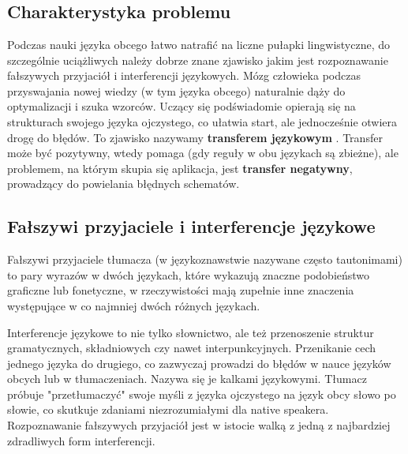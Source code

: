 \documentclass[polish]{aghengthesis}
\author{Jan Kowalski, Jan Malinowski, Wojciech Kowalski}
\date{\the\year}
\begin{document}
\maketitle
\tableofcontents

\chapter{\ChapterTitleProjectVision}
\section{Charakterystyka problemu}

Podczas nauki języka obcego łatwo natrafić na liczne pułapki lingwistyczne, do
szczególnie uciążliwych należy dobrze znane zjawisko jakim jest rozpoznawanie
fałszywych przyjaciół i interferencji językowych. Mózg człowieka podczas
przyswajania nowej wiedzy (w tym języka obcego) naturalnie dąży do optymalizacji
i szuka wzorców. Uczący się podświadomie opierają się na strukturach swojego
języka ojczystego, co ułatwia start, ale jednocześnie otwiera drogę do błędów.
To zjawisko nazywamy \textbf{transferem językowym} \cite{transfer_jezyowy}. Transfer
może być pozytywny, wtedy pomaga (gdy reguły w obu językach są zbieżne), ale problemem,
na którym skupia się aplikacja, jest \textbf{transfer negatywny}, prowadzący do
powielania błędnych schematów.

\section{Fałszywi przyjaciele i interferencje językowe}

Fałszywi przyjaciele tłumacza (w językoznawstwie nazywane często tautonimami) to
pary wyrazów w dwóch językach, które wykazują znaczne podobieństwo graficzne lub
fonetyczne, w rzeczywistości mają zupełnie inne znaczenia występujące w co
najmniej dwóch różnych językach.

Interferencje językowe to nie tylko słownictwo, ale też przenoszenie
struktur gramatycznych, składniowych czy nawet interpunkcyjnych. Przenikanie cech
jednego języka do drugiego, co zazwyczaj prowadzi do błędów w nauce języków obcych
lub w tłumaczeniach. Nazywa się je kalkami językowymi. Tłumacz próbuje "przetłumaczyć"
swoje myśli z języka ojczystego na język obcy słowo po słowie, co skutkuje zdaniami
niezrozumiałymi dla native speakera. Rozpoznawanie fałszywych przyjaciół jest w istocie
walką z jedną z najbardziej zdradliwych form interferencji.
\end{document}
